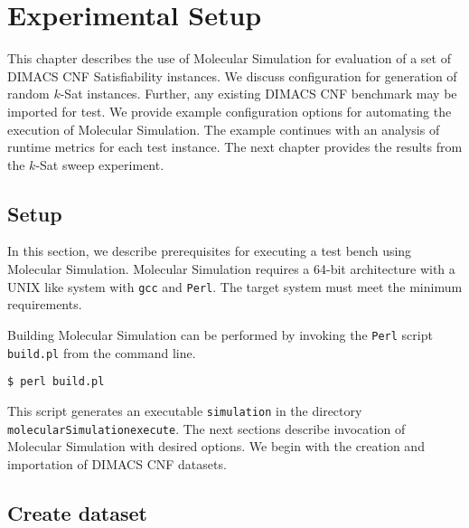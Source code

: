 \chapter{Experimental Setup}


This chapter describes the use of Molecular Simulation for evaluation of a set of DIMACS CNF {\sc Satisfiability} instances.  We discuss configuration for generation of random $k$-{\sc Sat} instances.  Further, any existing DIMACS CNF benchmark may be imported for test.  We provide example configuration options for automating the execution of Molecular Simulation.  The example continues with an analysis of runtime metrics for each test instance.  The next chapter provides the results from the $k$-{\sc Sat} sweep experiment.

	\section{Setup}


In this section, we describe prerequisites for executing a test bench using Molecular Simulation.  Molecular Simulation requires a 64-bit architecture with a UNIX like system with \texttt{gcc} and \texttt{Perl}.  The target system must meet the minimum requirements.  

Building Molecular Simulation can be performed by invoking the \texttt{Perl} script \texttt{build.pl} from the command line.

\begin{center}
\texttt{\$ perl build.pl}
\end{center}

\noindent This script generates an executable \texttt{simulation} in the directory \texttt{molecularSimulationexecute}.  The next sections describe invocation of Molecular Simulation with desired options.  We begin with the creation and importation of DIMACS CNF datasets.

		

	\section{Create dataset}


